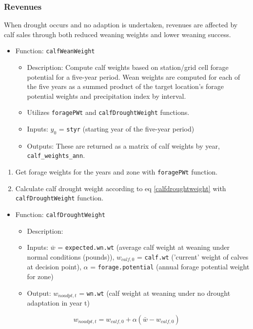 \documentclass[11pt]{article}
\begin{document}
\subsubsection{Revenues}
When drought occurs and no adaption is undertaken, revenues are affected by calf sales through both reduced weaning weights and lower weaning success.

\begin{itemize}
\item Function: \verb!calfWeanWeight!
	\begin{itemize}
	\item Description: Compute calf weights based on station/grid cell forage potential for a five-year period. Wean weights are computed for each of the five years as a summed product of the target location's forage potential weights and precipitation index by interval. 
	\item Utilizes \verb!foragePWt! and \verb!calfDroughtWeight! functions.
	\item Inputs: $y_0$ = \verb!styr! (starting year of the five-year period)
	\item Outputs: These are returned as a matrix of calf weights by year, \verb!calf_weights_ann!.
	\end{itemize}
\end{itemize}

\begin{enumerate}
\item Get forage weights for the years and zone with \verb!foragePWt! function.
\item Calculate calf drought weight according to eq \ref{calfdroughtweight} with \verb!calfDroughtWeight! function.
\end{enumerate}



\begin{itemize}
\item Function: \verb!calfDroughtWeight!
	\begin{itemize}
	\item Description:
	\item Inputs: $\bar{w}$ = \verb!expected.wn.wt! (average calf weight at weaning under normal conditions (pounds)), $w_{calf, 0}$ = \verb!calf.wt! ('current' weight of calves at decision point), $\alpha$ = \verb!forage.potential! (annual forage potential weight for zone)
	\item Output: $w_{noadpt, t}$ = \verb!wn.wt! (calf weight at weaning under no drought adaptation in year t)
	\end{itemize}
\end{itemize}
\begin{equation} \label{calfdroughtweight}
w_{noadpt, t} = w_{calf, 0} + \alpha (\bar{w} - w_{calf,0})
\end{equation}
\end{document}
